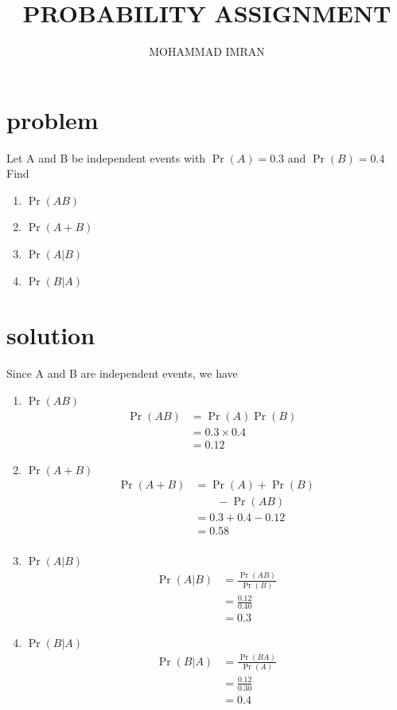 \documentclass[journal,12pt,twocolumn]{article}
\title{PROBABILITY ASSIGNMENT}
\author{MOHAMMAD IMRAN}
\providecommand{\pr}[1]{\ensuremath{\Pr\left(#1\right)}}
\begin{document}
\maketitle
\bigskip

\section{problem }

Let A and B be independent events with $\pr{A}=0.3$ and $\pr{B}=0.4$ Find 
\begin{enumerate}

\item$\pr{AB}$
\item$\pr{A+B}$ 
\item$\pr{A | B}$   
\item$\pr{B | A}$
       \end{enumerate}
\section{solution }  


Since A and B are independent events, we have 

\begin{enumerate}

\item $\pr{AB}$
\begin{align}
\pr{AB}&=\pr{A} \pr{B}& \nonumber \\
&=0.3 \times 0.4& \nonumber \\
&=0.12&
\end{align}
\item$\pr{A+B}$
\begin{align}
\pr{A+B}&=\pr{A}+\pr{B} \nonumber \\
& \qquad -\pr{AB} \nonumber\\
&=0.3+0.4-0.12 \nonumber \\
\qquad &=0.58 \nonumber \\
\end{align}
\item $\pr{A|B}$
\begin{align}
\pr{A|B}&=\frac{\pr{AB}}{\pr{B}}  \nonumber \\
&=\frac{0.12}{0.40} \nonumber \\
\qquad &=0.3
\end{align}
\item $\pr{B|A}$
\begin{align}
\pr{B|A}&=\frac{\pr{BA}}{\pr{A}} \nonumber\\
&=\frac{0.12}{0.30} \nonumber \\
\qquad &=0.4
\end{align}
\end{enumerate}
\end{document}
